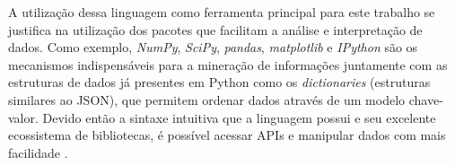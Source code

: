 A utilização dessa linguagem como ferramenta principal para este trabalho se justifica na utilização dos pacotes que facilitam a análise e interpretação de dados. Como exemplo, \textit{NumPy}, \textit{SciPy}, \textit{pandas}, \textit{matplotlib} e \textit{IPython} são os mecanismos indispensáveis para a mineração de informações juntamente com as estruturas de dados já presentes em Python como os \textit{dictionaries} (estruturas similares ao JSON), que permitem ordenar dados através de um modelo chave-valor. Devido então a sintaxe intuitiva que a linguagem possui e seu excelente ecossistema de bibliotecas, é possível acessar APIs e manipular dados com mais facilidade \cite{mining-social-web}.













